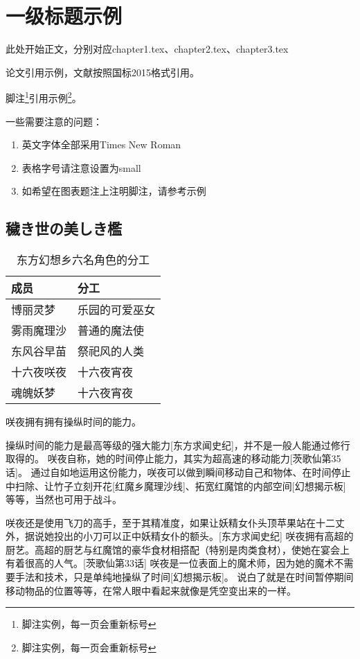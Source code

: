\chapter{一级标题示例}
此处开始正文，分别对应chapter1.tex、chapter2.tex、chapter3.tex

论文引用示例\cite{王宣承-1}，文献按照国标2015格式引用。

脚注\footnote{脚注实例，每一页会重新标号}引用示例\footnote{脚注实例，每一页会重新标号}。

一些需要注意的问题：
\begin{enumerate}
    \item 英文字体全部采用Times New Roman
    \item 表格字号请注意设置为small
    \item 如希望在图表题注上注明脚注，请参考示例
\end{enumerate}

\section{穢き世の美しき檻}

\begin{table}[H]
    \centering
    \small
    \caption{东方幻想乡六名角色的分工}
    \begin{tabularx}{\textwidth}{X >{\centering\arraybackslash}X}
        \toprule[1.0bp]
        成员    & 分工      \\
        \midrule[0.75bp]
        博丽灵梦  & 乐园的可爱巫女 \\
        雾雨魔理沙 & 普通的魔法使  \\
        东风谷早苗 & 祭祀风的人类  \\
        十六夜咲夜 & 十六夜宵夜   \\
        魂魄妖梦  & 十六夜宵夜   \\
        \bottomrule[1.0bp]
    \end{tabularx}
    \vspace{4bp}
\end{table}

咲夜拥有拥有操纵时间的能力。

操纵时间的能力是最高等级的强大能力[东方求闻史纪]，并不是一般人能通过修行取得的。
咲夜自称，她的时间停止能力，其实为超高速的移动能力[茨歌仙第35话]。
通过自如地运用这份能力，咲夜可以做到瞬间移动自己和物体、在时间停止中扫除、让竹子立刻开花[红魔乡魔理沙线]、拓宽红魔馆的内部空间[幻想揭示板]等等，当然也可用于战斗。

咲夜还是使用飞刀的高手，至于其精准度，如果让妖精女仆头顶苹果站在十二丈外，据说她投出的小刀可以正中妖精女仆的额头。[东方求闻史纪]
咲夜拥有高超的厨艺。高超的厨艺与红魔馆的豪华食材相搭配（特别是肉类食材），使她在宴会上有着很高的人气。[茨歌仙第33话]
咲夜是一位表面上的魔术师，因为她的魔术不需要手法和技术，只是单纯地操纵了时间[幻想揭示板]。 说白了就是在时间暂停期间移动物品的位置等等，在常人眼中看起来就像是凭空变出来的一样。
